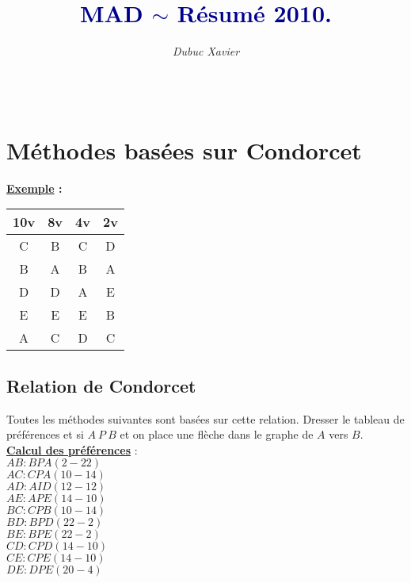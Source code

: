 \documentclass{article}
\title{\textbf{\textcolor{darkblue}{MAD $\sim$ Résumé 2010.}}}
\author{\textit{Dubuc Xavier} \\ \red{xionhearts@hotmail.com}}
\newcommand{\stitre}[1]{\noindent\textbf{\underline{#1}}}
\begin{document}
\maketitle

\hbox{\raisebox{0.4em}{\vrule depth 0.4pt height 0.4pt width 10cm}}

\tableofcontents

$ $ \\
\hbox{\raisebox{0.4em}{\vrule depth 0.4pt height 0.4pt width 10cm}}

\newpage

\section{Méthodes basées sur Condorcet}

\textbf{\underline{Exemple} :}
\begin{center}
	\begin{tabular}{|*{4}{c|}}
	\hline
	\textbf{10v }& \textbf{8v} & \textbf{4v} & \textbf{2v} \\
	\hline
	C & B & C & D \\
	B & A & B & A \\
	D & D & A & E \\
	E & E & E & B \\
	A & C & D & C \\
	\hline
	\end{tabular}
\end{center}
\subsection{Relation de Condorcet}

Toutes les méthodes suivantes sont basées sur cette relation.
Dresser le tableau de préférences et si $A\ P\ B$ et on place une flèche dans le graphe de $A$ vers $B$. \\

\stitre{Calcul des préférences} : \\

\noindent $AB : BPA (2-22)$\\
$AC : CPA (10-14)$ \\
$AD : AID (12-12)$ \\
$AE : APE (14-10)$ \\
$BC : CPB (10-14)$ \\
$BD : BPD (22-2)$ \\
$BE : BPE (22-2)$ \\
$CD : CPD (14-10)$ \\
$CE : CPE (14-10)$ \\
$DE : DPE (20-4)$ \\
\end{document}
